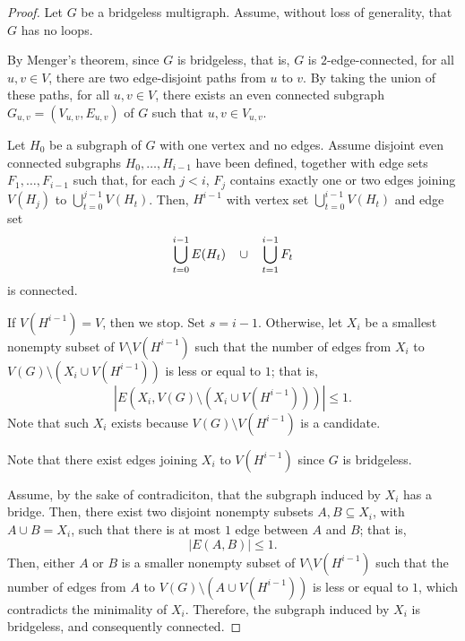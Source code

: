 \begin{proof}
	Let \(G\) be a bridgeless multigraph.
	Assume, without loss of generality, that \(G\) has no loops.

	By Menger's theorem,
	since \(G\) is bridgeless, that is, \(G\) is \(2\)-edge-connected,
	for all \(u, v \in V\),
	there are two edge-disjoint paths from \(u\) to \(v\).
	By taking the union of these paths,
	for all \(u, v \in V\),
	there exists an even connected subgraph \(G_{u, v} = (V_{u, v}, E_{u, v})\) of \(G\) such that \(u, v \in V_{u, v}\).

	Let \(H_0\) be a subgraph of \(G\) with one vertex and no edges.
	Assume disjoint even connected subgraphs \(H_0, \dots, H_{i-1}\) have been defined, together with edge sets \(F_1, \dots, F_{i-1}\) such that, for each \(j < i\),
	\(F_j\) contains exactly one or two edges joining \(V(H_j)\) to \(\bigcup_{t = 0}^{j-1} V(H_t)\).
	Then, \(H^{i-1}\) with vertex set \(\bigcup_{t = 0}^{i-1} V(H_t)\) and edge set
	\begin{equation}
		\medmuskip=20mu
		\bigcup_{t = 0}^{i-1} E(H_t) \cup \bigcup_{t = 1}^{i-1} F_t
	\end{equation}
	is connected.

	If \(V(H^{i-1}) = V\), then we stop. Set \(s = i - 1\).
	Otherwise,
	let \(X_i\) be a smallest nonempty subset of \(V \setminus V(H^{i-1})\) such that the number of edges from \(X_i\) to \(V(G) \setminus (X_i \cup V(H^{i-1}))\) is less or equal to \(1\); that is,
	\begin{equation}
		\left| E\left(X_i, V(G) \setminus (X_i \cup V(H^{i-1}))\right) \right| \leq 1.
	\end{equation}
	Note that such \(X_i\) exists because \(V(G) \setminus V(H^{i-1})\) is a candidate.

	Note that there exist edges joining \(X_i\) to \(V(H^{i-1})\) since \(G\) is bridgeless.

	Assume, by the sake of contradiciton, that the subgraph induced by \(X_i\) has a bridge.
	Then, there exist two disjoint nonempty subsets \(A, B \subseteq X_i\), with \(A \cup B = X_i\), such that there is at most \(1\) edge between \(A\) and \(B\); that is,
	\begin{equation}
		\left| E(A, B) \right| \leq 1.
	\end{equation}
	Then, either \(A\) or \(B\) is a smaller nonempty subset of \(V \setminus V(H^{i-1})\) such that the number of edges from \(A\) to \(V(G) \setminus (A \cup V(H^{i-1}))\) is less or equal to \(1\), which contradicts the minimality of \(X_i\).
	Therefore, the subgraph induced by \(X_i\) is bridgeless, and consequently connected.


\end{proof}
